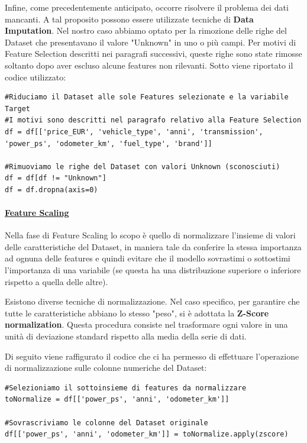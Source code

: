 Infine, come precedentemente anticipato, occorre risolvere il problema dei dati mancanti. A tal proposito possono essere utilizzate tecniche di \textbf{Data Imputation}. Nel nostro caso abbiamo optato per la rimozione delle righe del Dataset che presentavano il valore "Unknown" in uno o più campi. Per motivi di Feature Selection descritti nei paragrafi successivi, queste righe sono state rimosse soltanto dopo aver escluso alcune features non rilevanti. Sotto viene riportato il codice utilizzato:

\lstset{language=Python}
\lstset{frame=lines}
\lstset{basicstyle=\footnotesize}
\lstset{columns=fullflexible}
\begin{lstlisting}
#Riduciamo il Dataset alle sole Features selezionate e la variabile Target
#I motivi sono descritti nel paragrafo relativo alla Feature Selection
df = df[['price_EUR', 'vehicle_type', 'anni', 'transmission', 'power_ps', 'odometer_km', 'fuel_type', 'brand']]

#Rimuoviamo le righe del Dataset con valori Unknown (sconosciuti)
df = df[df != "Unknown"]
df = df.dropna(axis=0)
\end{lstlisting}
\bigskip
\bigskip

\paragraph{\textcolor[HTML]{000099}{\underline{Feature Scaling}}}
Nella fase di Feature Scaling lo scopo è quello di normalizzare l'insieme di valori delle caratteristiche del Dataset, in maniera tale da conferire la stessa importanza ad ognuna delle features e quindi evitare che il modello sovrastimi o sottostimi l'importanza di una variabile (se questa ha una distribuzione superiore o inferiore rispetto a quella delle altre).

Esistono diverse tecniche di normalizzazione. Nel caso specifico, per garantire che tutte le caratteristiche abbiano lo stesso "peso", si è adottata la \textbf{Z-Score normalization}. Questa procedura consiste nel trasformare ogni valore in una unità di deviazione standard rispetto alla media della serie di dati. 

Di seguito viene raffigurato il codice che ci ha permesso di effettuare l'operazione di normalizzazione sulle colonne numeriche del Dataset:

\lstset{language=Python}
\lstset{frame=lines}
\lstset{basicstyle=\footnotesize}
\lstset{columns=fullflexible}
\begin{lstlisting}
#Selezioniamo il sottoinsieme di features da normalizzare
toNormalize = df[['power_ps', 'anni', 'odometer_km']]

#Sovrascriviamo le colonne del Dataset originale
df[['power_ps', 'anni', 'odometer_km']] = toNormalize.apply(zscore)
\end{lstlisting}
\bigskip

